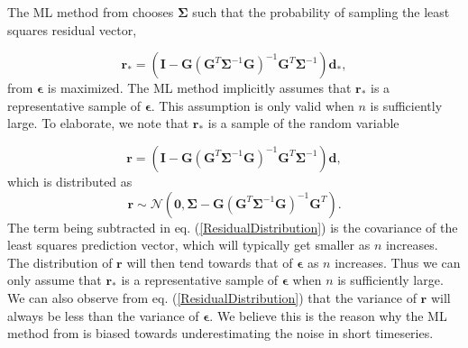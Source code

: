 \documentclass[10pt,a4paper]{article}
\begin{document}
The ML method from \citet{Langbein1997} chooses $\mathbf{\Sigma}$ such that the probability of sampling the least squares residual vector,

\begin{equation}\label{ResidualRealization}
  \mathbf{r}_* =  \left(\mathbf{I} - \mathbf{G}\left(\mathbf{G}^T\mathbf{\Sigma}^{-1}\mathbf{G}\right)^{-1}\mathbf{G}^T\mathbf{\Sigma}^{-1}\right)\mathbf{d_*},
\end{equation}  
from $\mathbf{\epsilon}$ is maximized. The ML method implicitly assumes that $\mathbf{r}_*$ is a representative sample of $\mathbf{\epsilon}$. This assumption is only valid when $n$ is sufficiently large. To elaborate, we note that $\mathbf{r_*}$ is a sample of the random variable

\begin{equation}\label{ResidualVariable}
  \mathbf{r} =  \left(\mathbf{I} - \mathbf{G}\left(\mathbf{G}^T\mathbf{\Sigma}^{-1}\mathbf{G}\right)^{-1}\mathbf{G}^T\mathbf{\Sigma}^{-1}\right)\mathbf{d},
\end{equation}  
which is distributed as
\begin{equation}\label{ResidualDistribution}
  \mathbf{r} \sim \mathcal{N}\left(\mathbf{0},\mathbf{\Sigma} - \mathbf{G}\left(\mathbf{G}^T\mathbf{\Sigma}^{-1}\mathbf{G}\right)^{-1}\mathbf{G}^T\right).
\end{equation}
The term being subtracted in eq. (\ref{ResidualDistribution}) is the covariance of the least squares prediction vector, which will typically get smaller as $n$ increases. The distribution of $\mathbf{r}$ will then tend towards that of $\mathbf{\epsilon}$ as $n$ increases. Thus we can only assume that $\mathbf{r}_*$ is a representative sample of $\mathbf{\epsilon}$ when $n$ is sufficiently large. We can also observe from eq. (\ref{ResidualDistribution}) that the variance of $\mathbf{r}$ will always be less than the variance of $\mathbf{\epsilon}$.  We believe this is the reason why the ML method from \citet{Langbein1997} is biased towards underestimating the noise in short timeseries.
\end{document}
